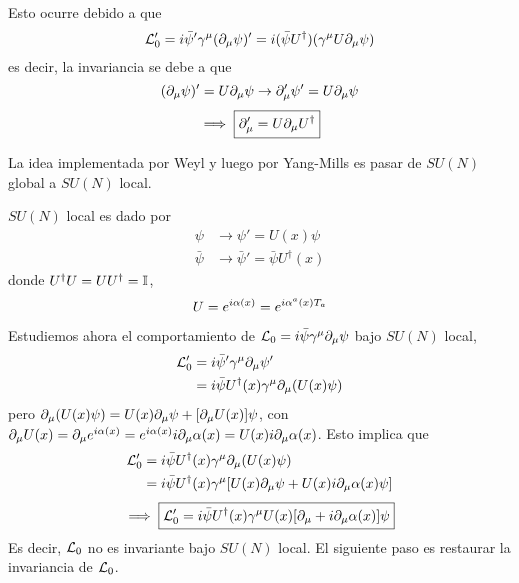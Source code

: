 Esto ocurre debido a que
\begin{equation}
  \mathcal{L}_0'=i\bar{\psi}'\gamma^\mu (\partial_\mu \psi)'=i(\bar{\psi}U^\dagger)(\gamma^\mu U \partial_\mu \psi)
\end{equation}
es decir, la invariancia se debe a que
\begin{equation}
  (\partial_\mu \psi)'=U\partial_\mu \psi\rightarrow \partial_\mu '\psi'=U\partial_\mu \psi
\end{equation}
\begin{equation}
  \implies \boxed{\partial_\mu '=U\partial_\mu U^\dagger}
\end{equation}

La idea implementada por Weyl y luego por Yang-Mills es pasar de $SU(N)$ global a $SU(N)$ local. 

$SU(N)$ local es dado por
\begin{align}
  \psi&\to \psi'=U(x)\psi\\
  \bar{\psi}&\to \bar{\psi}'=\bar{\psi }U^\dagger (x)
\end{align}
donde $U^\dagger U=UU^\dagger =\mathbb{I} $,
\begin{equation}
  U=e^{i\alpha (x)}=e^{i\alpha^{a}(x)T_a}
\end{equation}

Estudiemos ahora el comportamiento de $\mathcal{L}_0=i\bar{\psi}\gamma^\mu \partial_\mu \psi$ bajo $SU(N)$ local,
\begin{align}
  \mathcal{L}_0'&=i\bar{\psi}'\gamma^\mu \partial_\mu \psi'\\
  &=i\bar{\psi}U^\dagger (x )\gamma^\mu \partial_\mu (U(x)\psi)
\end{align}
pero $\partial_\mu (U(x)\psi)=U(x)\partial_\mu \psi+[\partial_\mu U(x)]\psi$, con $\partial_\mu U(x)=\partial_\mu e^{i\alpha(x)}=e^{i\alpha(x)}i\partial_\mu \alpha(x)=U(x)i\partial_\mu \alpha (x)$. Esto implica que
\begin{align}
  \mathcal{L}_0'&=i\bar{\psi}U^\dagger (x )\gamma^\mu \partial_\mu (U(x)\psi)\\
  &=i\bar{\psi}U^\dagger(x )\gamma^\mu [U(x)\partial_\mu \psi+U(x)i\partial_\mu \alpha(x)\psi]
\end{align}
\begin{equation}\label{25.2}
  \implies \boxed{\mathcal{L}_0'=i\bar{\psi}U^\dagger(x)\gamma^\mu U(x)[\partial_\mu +i\partial_\mu \alpha (x)]\psi}
\end{equation}
Es decir, $\mathcal{L}_0$ no es invariante bajo $SU(N)$ local. El siguiente paso es restaurar la invariancia de $\mathcal{L}_0$.

